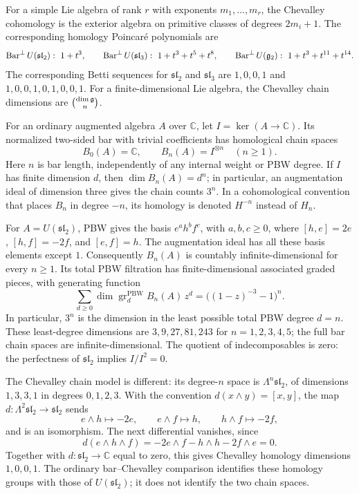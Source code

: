 \begin{calculation}
\label{calc:simple-spine}
For a simple Lie algebra of rank $r$ with exponents $m_1,\dots,m_r$, the
Chevalley cohomology is the exterior algebra on primitive classes of degrees
$2m_i+1$. The corresponding homology Poincar\'e polynomials are
\[
 \operatorname{Bar}^{\perp} U(\mathfrak{sl}_2):\ 1+t^3,
 \qquad
 \operatorname{Bar}^{\perp} U(\mathfrak{sl}_3):\ 1+t^3+t^5+t^8,
 \qquad
 \operatorname{Bar}^{\perp} U(\mathfrak g_2):\ 1+t^3+t^{11}+t^{14}.
\]
The corresponding Betti sequences for $\mathfrak{sl}_2$ and $\mathfrak{sl}_3$ are
$1,0,0,1$ and $1,0,0,1,0,1,0,0,1$.
For a finite-dimensional Lie algebra, the Chevalley chain dimensions are
$\binom{\dim\mathfrak g}{n}$.

For an ordinary augmented algebra $A$ over $\mathbb C$, let
$I=\ker(A\to\mathbb C)$.  Its normalized two-sided bar with trivial
coefficients has homological chain spaces
\[
 B_0(A)=\mathbb C,\qquad B_n(A)=I^{\otimes n}\quad(n\ge1).
\]
Here $n$ is bar length, independently of any internal weight or PBW degree.
If $I$ has finite dimension $d$, then $\dim B_n(A)=d^n$; in particular,
an augmentation ideal of dimension three gives the chain counts $3^n$.
In a cohomological convention that places $B_n$ in degree $-n$, its homology
is denoted $H^{-n}$ instead of $H_n$.

For $A=U(\mathfrak{sl}_2)$, PBW gives the basis
$e^a h^b f^c$, with $a,b,c\ge0$, where
$[h,e]=2e$, $[h,f]=-2f$, and $[e,f]=h$.
The augmentation ideal has all these basis elements except $1$.
Consequently $B_n(A)$ is countably infinite-dimensional for every $n\ge1$.
Its total PBW filtration has finite-dimensional associated graded pieces,
with generating function
\[
 \sum_{d\ge0}\dim\operatorname{gr}^{\mathrm{PBW}}_d B_n(A)\,z^d
 =\bigl((1-z)^{-3}-1\bigr)^n.
\]
In particular, $3^n$ is the dimension in the least possible total PBW degree
$d=n$. These least-degree dimensions are $3,9,27,81,243$ for
$n=1,2,3,4,5$; the full bar chain spaces are infinite-dimensional. The quotient of
indecomposables is zero: the perfectness of $\mathfrak{sl}_2$ implies $I/I^2=0$.

The Chevalley chain model is different: its degree-$n$ space is
$\Lambda^n\mathfrak{sl}_2$, of dimensions $1,3,3,1$ in degrees $0,1,2,3$.
With the convention $d(x\wedge y)=[x,y]$, the map
$d:\Lambda^2\mathfrak{sl}_2\to\mathfrak{sl}_2$ sends
\[
 e\wedge h\longmapsto-2e,\qquad
 e\wedge f\longmapsto h,\qquad
 h\wedge f\longmapsto-2f,
\]
and is an isomorphism.  The next differential vanishes, since
\[
 d(e\wedge h\wedge f)
 =-2e\wedge f-h\wedge h-2f\wedge e=0.
\]
Together with $d:\mathfrak{sl}_2\to\mathbb C$ equal to zero, this gives
Chevalley homology dimensions $1,0,0,1$.  The ordinary bar--Chevalley
comparison identifies these homology groups with those of $U(\mathfrak{sl}_2)$;
it does not identify the two chain spaces.

\end{calculation}

